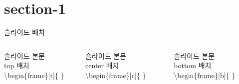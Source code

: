 \documentclass[9pt,blue,xcolor=pdftex,dvipsnames,table,handout,notes]{beamer}
\begin{document}
		\section{section-1}
		\begin{frame}[c]{슬라이드 배치}



		\begin{columns}


			\begin{column}{.3\textwidth}
				\begin{block} {슬라이드 본문\\ top 배치}
				\textbackslash begin\{frame\}[t]\{ \}
				\end{block}
			\end{column}

			\begin{column}{.3\textwidth}
				\begin{block} {슬라이드 본문\\ center 배치}
				\textbackslash begin\{frame\}[c]\{ \}
				\end{block}
			\end{column}

			\begin{column}{.31\textwidth}
				\begin{block} {슬라이드 본문\\ bottom 배치}
				\textbackslash begin\{frame\}[b]\{ \}
				\end{block}
			\end{column}

		\end{columns}
		\end{frame}
\end{document}
